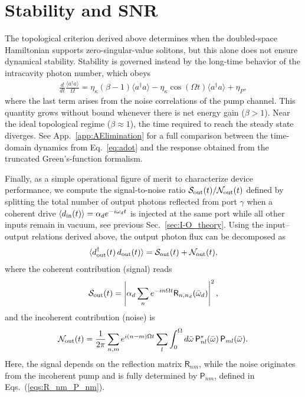\documentclass[a4paper,twocolumn,floatfix,10pt,superscriptaddress]%
{quantumarticle}
\newcommand{\msf}[1]{\mathsf{#1}}
\newcommand{\mcl}[1]{\mathcal{#1}}
\begin{document}
\section{Stability and SNR}\label{sec:Stability_SNR}
The topological criterion derived above determines when the doubled-space Hamiltonian supports zero-singular-value solitons, but this alone does not ensure dynamical stability. Stability is governed instead by the long-time behavior of the intracavity photon number, which obeys 
\begin{align}
    \frac{d}{dt} \frac{\langle a^\dagger a \rangle}{\Omega} = \eta_\kappa\left(\beta - 1  \right) \langle a^\dagger a \rangle - \eta_\kappa  \cos(\Omega t) \langle a^\dagger a \rangle + \eta_P\nonumber,
\end{align}
where the last term arises from the noise correlations of the pump channel. This quantity grows without bound whenever there is net energy gain ($\beta>1$). Near the ideal topological regime ($\beta\approx1$), the time required to reach the steady state diverges. See App.~\ref{app:AElimination} for a full comparison between the time-domain dynamics from Eq.~\eqref{eq:adot} and the response obtained from the truncated Green’s-function formalism.

Finally, as a simple operational figure of merit to characterize device performance, we compute the signal-to-noise ratio $\mcl{S}_{\rm out}(t)/\mcl{N}_{\rm out}(t)$ defined by splitting the total number of output photons reflected from port $\gamma$ when a coherent drive $\langle d_{\rm in}(t) \rangle = \alpha_d e^{-i\omega_d t}$ is injected at the same port while all other inputs remain in vacuum, see previous Sec.~\ref{sec:I-O_theory}. Using the input–output relations derived above, the output photon flux can be decomposed as
\begin{align}
\langle d_{\rm out}^\dag(t)\,d_{\rm out}(t)\rangle
=\mcl{S}_{\rm out}(t)+\mcl{N}_{\rm out}(t),
\end{align}
where the coherent contribution (signal) reads
\begin{align}
\mcl{S}_{\rm out}(t)
=\left|\alpha_d\sum_n e^{-i n \Omega t} \msf{R}_{n,n_d}(\bar\omega_d)\right|^2,
\end{align}
and the incoherent contribution (noise) is
\begin{align}
\mcl{N}_{\rm out}(t)
=\frac{1}{2\pi} \sum_{n,m}e^{i(n-m)\Omega t}
\sum_{l}\int_0^{\Omega} d\bar\omega \,
\msf{P}^*_{n l}(\bar\omega)\,\msf{P}_{m l}(\bar\omega).
\end{align}
Here, the signal depends on the reflection matrix $\msf{R}_{nm}$, while the noise originates from the incoherent pump and is fully determined by $\msf{P}_{nm}$, defined in Eqs.~(\ref{eqs:R_nm_P_nm}).
\end{document}
